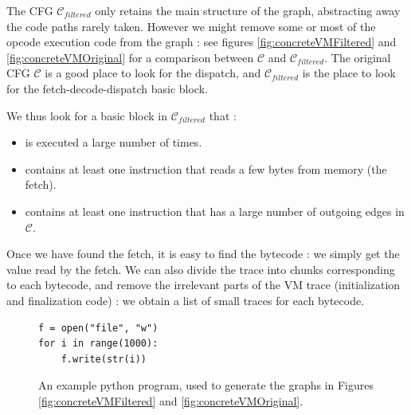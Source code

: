 \documentclass[english]{article}
\begin{document}
The CFG $\mathcal{C}_{filtered}$ only retains the main structure of the graph, abstracting away the code paths rarely taken. However we might remove some or most of the opcode execution code from the graph : see figures \ref{fig:concreteVMFiltered} and \ref{fig:concreteVMOriginal} for a comparison between $\mathcal{C}$ and $\mathcal{C}_{filtered}$. The original CFG $\mathcal{C}$ is a good place to look for the dispatch, and $\mathcal{C}_{filtered}$ is the place to look for the fetch-decode-dispatch basic block. 

We thus look for a basic block in $\mathcal{C}_{filtered}$ that :
\begin{itemize}
	\item is executed a large number of times.
	\item contains at least one instruction that reads a few bytes from memory (the fetch).
	\item contains at least one instruction that has a large number of outgoing edges in $\mathcal{C}$.
\end{itemize}

Once we have found the fetch, it is easy to find the bytecode : we simply get the value read by the fetch. We can also divide the trace into chunks corresponding to each bytecode, and remove the irrelevant parts of the VM trace (initialization and finalization code) : we obtain a list of small traces for each bytecode.

\begin{figure}[htp]
	\centering 
	\begin{BVerbatim}
f = open("file", "w")
for i in range(1000):
	f.write(str(i))
	\end{BVerbatim}
	\caption{An example python program, used to generate the graphs in Figures 	\ref{fig:concreteVMFiltered} and \ref{fig:concreteVMOriginal}.}
	\label{fig:examplePythonProg}
\end{figure}
\end{document}

